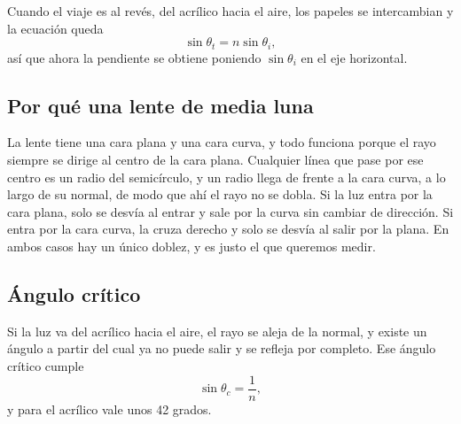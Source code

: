 Cuando el viaje es al revés, del acrílico hacia el aire, los papeles se intercambian y la ecuación queda
\begin{equation}
\sin\theta_t = n \sin\theta_i ,
\label{eq:recta2}
\end{equation}
así que ahora la pendiente se obtiene poniendo $\sin\theta_i$ en el eje horizontal.

\subsection{Por qué una lente de media luna}
La lente tiene una cara plana y una cara curva, y todo funciona porque el rayo siempre se dirige al centro de la cara plana. Cualquier línea que pase por ese centro es un radio del semicírculo, y un radio llega de frente a la cara curva, a lo largo de su normal, de modo que ahí el rayo no se dobla. Si la luz entra por la cara plana, solo se desvía al entrar y sale por la curva sin cambiar de dirección. Si entra por la cara curva, la cruza derecho y solo se desvía al salir por la plana. En ambos casos hay un único doblez, y es justo el que queremos medir.

\subsection{Ángulo crítico}
Si la luz va del acrílico hacia el aire, el rayo se aleja de la normal, y existe un ángulo a partir del cual ya no puede salir y se refleja por completo. Ese ángulo crítico cumple
\begin{equation}
\sin\theta_c = \frac{1}{n},
\label{eq:critico}
\end{equation}
y para el acrílico vale unos 42 grados.
